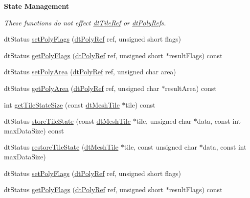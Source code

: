 \begin{Indent}\textbf{ State Management}\par
{\em These functions do not effect \hyperlink{group__detour_ga608138970cbb12594287ea6523be24ef}{dt\+Tile\+Ref} or \hyperlink{group__detour_ga07c358f7bddf0fa2ef79e341a387c1dd}{dt\+Poly\+Ref}\textquotesingle{}s. }\begin{DoxyCompactItemize}
\item 
dt\+Status \hyperlink{classdtNavMesh_af11a9e69fa88b6d5cf66c376d46b8889}{set\+Poly\+Flags} (\hyperlink{group__detour_gab4e0b2257a670c1a800057999612b466}{dt\+Poly\+Ref} ref, unsigned short flags)
\item 
dt\+Status \hyperlink{classdtNavMesh_a8d5d33030fc21afa6b1be3c80689f9b7}{get\+Poly\+Flags} (\hyperlink{group__detour_gab4e0b2257a670c1a800057999612b466}{dt\+Poly\+Ref} ref, unsigned short $\ast$result\+Flags) const
\item 
dt\+Status \hyperlink{classdtNavMesh_a74a6e65e04a87a1b6abf837349f214fb}{set\+Poly\+Area} (\hyperlink{group__detour_gab4e0b2257a670c1a800057999612b466}{dt\+Poly\+Ref} ref, unsigned char area)
\item 
dt\+Status \hyperlink{classdtNavMesh_aac53c07a2ab699b15228c91a17b3bafd}{get\+Poly\+Area} (\hyperlink{group__detour_gab4e0b2257a670c1a800057999612b466}{dt\+Poly\+Ref} ref, unsigned char $\ast$result\+Area) const
\item 
int \hyperlink{classdtNavMesh_aaf6f0b0ce2bd81c5e6cd8ac67f6a8638}{get\+Tile\+State\+Size} (const \hyperlink{structdtMeshTile}{dt\+Mesh\+Tile} $\ast$tile) const
\item 
dt\+Status \hyperlink{classdtNavMesh_a141e01263950382365468ea265f48758}{store\+Tile\+State} (const \hyperlink{structdtMeshTile}{dt\+Mesh\+Tile} $\ast$tile, unsigned char $\ast$data, const int max\+Data\+Size) const
\item 
dt\+Status \hyperlink{classdtNavMesh_aef336a67e552a9d031d669ec84029fb8}{restore\+Tile\+State} (\hyperlink{structdtMeshTile}{dt\+Mesh\+Tile} $\ast$tile, const unsigned char $\ast$data, const int max\+Data\+Size)
\item 
dt\+Status \hyperlink{classdtNavMesh_af11a9e69fa88b6d5cf66c376d46b8889}{set\+Poly\+Flags} (\hyperlink{group__detour_gab4e0b2257a670c1a800057999612b466}{dt\+Poly\+Ref} ref, unsigned short flags)
\item 
dt\+Status \hyperlink{classdtNavMesh_a8d5d33030fc21afa6b1be3c80689f9b7}{get\+Poly\+Flags} (\hyperlink{group__detour_gab4e0b2257a670c1a800057999612b466}{dt\+Poly\+Ref} ref, unsigned short $\ast$result\+Flags) const

\end{DoxyCompactItemize}
\end{Indent}
